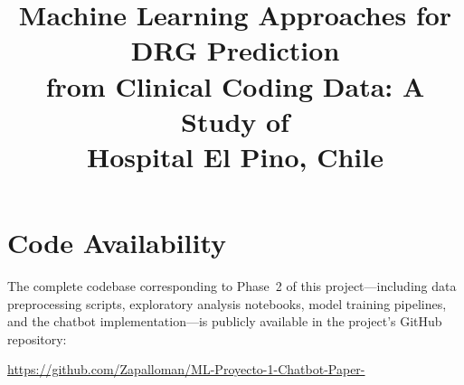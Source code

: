 \documentclass[conference]{IEEEtran}
\begin{document}
\title{Machine Learning Approaches for DRG Prediction\\from Clinical Coding Data: A Study of\\Hospital El Pino, Chile}

\author{
}

\maketitle












\section*{Code Availability}
The complete codebase corresponding to Phase~2 of this project---including data preprocessing scripts, exploratory analysis notebooks, model training pipelines, and the chatbot implementation---is publicly available in the project's GitHub repository:
\begin{center}
\url{https://github.com/Zapalloman/ML-Proyecto-1-Chatbot-Paper-}
\end{center}
\end{document}
